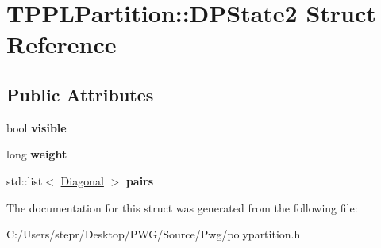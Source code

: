 \hypertarget{struct_t_p_p_l_partition_1_1_d_p_state2}{}\section{T\+P\+P\+L\+Partition\+:\+:D\+P\+State2 Struct Reference}
\label{struct_t_p_p_l_partition_1_1_d_p_state2}
\subsection*{Public Attributes}
\begin{DoxyCompactItemize}
\item 
\mbox{\label{struct_t_p_p_l_partition_1_1_d_p_state2_a5d13bb854ca34eb14a51dbd5d2e14bfb}} 
bool {\bfseries visible}
\item 
\mbox{\label{struct_t_p_p_l_partition_1_1_d_p_state2_af845eec6c313d9e00a1c73ac3e2adf3a}} 
long {\bfseries weight}
\item 
\mbox{\label{struct_t_p_p_l_partition_1_1_d_p_state2_a6dd5ee06609473cd92ebf79fe421ae11}} 
std\+::list$<$ \mbox{\hyperlink{struct_t_p_p_l_partition_1_1_diagonal}{Diagonal}} $>$ {\bfseries pairs}
\end{DoxyCompactItemize}


The documentation for this struct was generated from the following file\+:\begin{DoxyCompactItemize}
\item 
C\+:/\+Users/stepr/\+Desktop/\+P\+W\+G/\+Source/\+Pwg/polypartition.\+h\end{DoxyCompactItemize}
